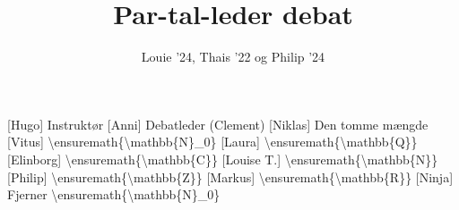 \documentclass[a4paper,11pt]{article}
\title{Par-tal-leder debat}
\author{Louie '24, Thais '22 og Philip '24}
\begin{document}
\maketitle

\begin{roles}
[Hugo] Instruktør
[Anni] Debatleder (Clement)
[Niklas] Den tomme mængde
[Vitus] \textbackslash{}ensuremath\{\textbackslash{}mathbb\{N\}\_0\}
[Laura] \textbackslash{}ensuremath\{\textbackslash{}mathbb\{Q\}\}
[Elinborg] \textbackslash{}ensuremath\{\textbackslash{}mathbb\{C\}\}
[Louise T.] \textbackslash{}ensuremath\{\textbackslash{}mathbb\{N\}\}
[Philip] \textbackslash{}ensuremath\{\textbackslash{}mathbb\{Z\}\}
[Markus] \textbackslash{}ensuremath\{\textbackslash{}mathbb\{R\}\}
[Ninja] Fjerner \textbackslash{}ensuremath\{\textbackslash{}mathbb\{N\}\_0\}
\end{roles}
\end{document}
